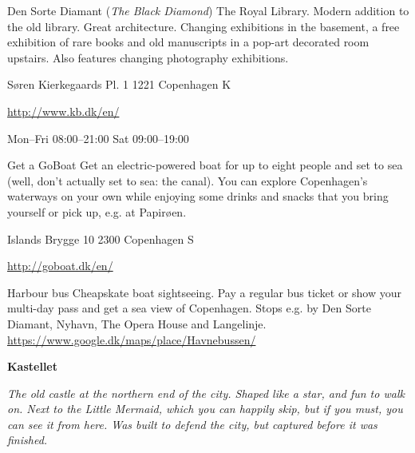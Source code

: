 \begin{funitem}
{Den Sorte Diamant (\textit{The Black Diamond})}
{The Royal Library. Modern addition to the old library. Great architecture. Changing exhibitions in the basement, a free exhibition of rare books and old manuscripts in a pop-art decorated room upstairs. Also features changing photography exhibitions.}
{\begin{addr}
{Søren Kierkegaards Pl. 1}
{1221 Copenhagen K}
\end{addr}}
{\url{http://www.kb.dk/en/}}
{\begin{ohours}
{Mon–Fri}
{08:00–21:00}
{Sat}
{09:00–19:00}
{}
{}
{}
{}
\end{ohours}}
\end{funitem}
\begin{funitem}
{Get a GoBoat}
{Get an electric-powered boat for up to eight people and set to sea (well, don’t actually set to sea: the canal). You can explore Copenhagen’s waterways on your own while enjoying some drinks and snacks that you bring yourself or pick up, e.g. at Papirøen.}
{\begin{addr}
{Islands Brygge 10}
{2300 Copenhagen S}
\end{addr}}
{\url{http://goboat.dk/en/}}
{\begin{ohours}
{}
{}
{}
{}
{}
{}
{}
{}
\end{ohours}}
\end{funitem}
\begin{funitemshort}
{Harbour bus}
{Cheapskate boat sightseeing. Pay a regular bus ticket or show your multi-day pass  and get a sea view of Copenhagen. Stops e.g. by Den Sorte Diamant, Nyhavn, The Opera House and Langelinje.}
{\url{https://www.google.dk/maps/place/Havnebussen/ }}
\end{funitemshort}
\noindent\textbf{Kastellet}
\par\noindent\emph{The old castle at the northern end of the city. Shaped like a star, and fun to walk on. Next to the Little Mermaid, which you can happily skip, but if you must, you can see it from here. Was built to defend the city, but captured before it was finished.}
\medskip

